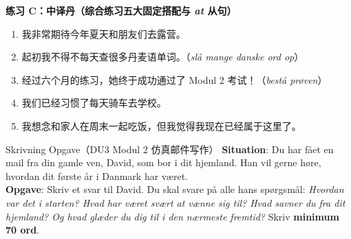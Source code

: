 \textbf{练习 C：中译丹（综合练习五大固定搭配与 \textit{at} 从句）}
\begin{enumerate}
  \item 我非常期待今年夏天和朋友们去露营。
  \item 起初我不得不每天查很多丹麦语单词。（\textit{slå mange danske ord op}）
  \item 经过六个月的练习，她终于成功通过了 Modul 2 考试！（\textit{bestå prøven}）
  \item 我们已经习惯了每天骑车去学校。
  \item 我想念和家人在周末一起吃饭，但我觉得我现在已经属于这里了。
\end{enumerate}


\begin{emailbox}{Skrivning Opgave（DU3 Modul 2 仿真邮件写作）}
\textbf{Situation}: Du har fået en mail fra din gamle ven, David, som bor i dit hjemland. Han vil gerne høre, hvordan dit første år i Danmark har været.\\
\textbf{Opgave}: Skriv et svar til David. Du skal svare på alle hans spørgsmål: \textit{Hvordan var det i starten? Hvad har været svært at vænne sig til? Hvad savner du fra dit hjemland? Og hvad glæder du dig til i den nærmeste fremtid?} Skriv \textbf{minimum 70 ord}.
\end{emailbox}

